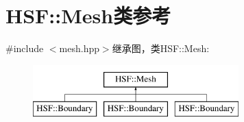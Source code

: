 \hypertarget{classHSF_1_1Mesh}{
\section{HSF::Mesh类参考}
\label{classHSF_1_1Mesh}
}


{\ttfamily \#include $<$mesh.hpp$>$}继承图，类HSF::Mesh:\begin{figure}[H]
\begin{center}
\leavevmode
\includegraphics[height=2cm]{classHSF_1_1Mesh}
\end{center}
\end{figure}
